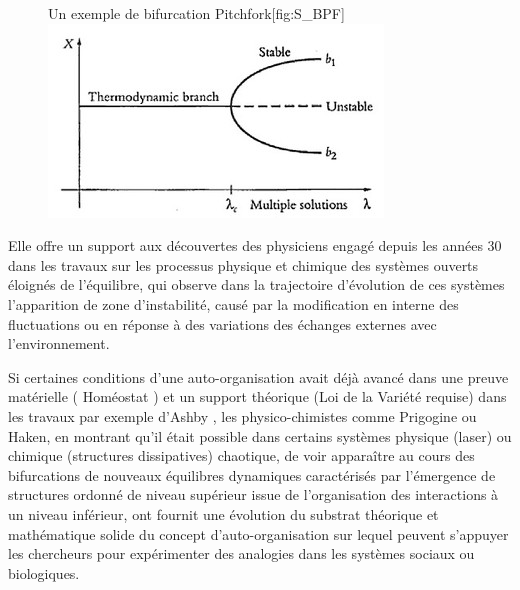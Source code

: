 \begin{figure}[h]
\begin{sidecaption}[fortoc]{Un exemple de bifurcation Pitchfork}[fig:S_BPF]
  \centering
 \includegraphics[width=.7\linewidth]{pitchfork_bifurcation.jpeg}
  \end{sidecaption}
\end{figure}


Elle offre un support aux découvertes des physiciens engagé depuis les années 30 dans les travaux sur les processus physique et chimique des systèmes ouverts éloignés de l'équilibre, qui observe dans la trajectoire d'évolution de ces systèmes l'apparition de zone d'instabilité, causé par la modification en interne des fluctuations ou en réponse à des variations des échanges externes avec l'environnement. 

Si certaines conditions d'une auto-organisation avait déjà avancé dans une preuve matérielle ( Homéostat ) et un support théorique (Loi de la Variété requise) dans les travaux par exemple d'Ashby \autocite[800-801]{Pouvreau2013}, les physico-chimistes comme Prigogine ou Haken, en montrant qu'il était possible dans certains systèmes physique (laser) ou chimique (structures dissipatives) chaotique, de voir apparaître au cours des bifurcations de nouveaux équilibres dynamiques caractérisés par l'émergence de structures ordonné de niveau supérieur issue de l'organisation des interactions à un niveau inférieur, ont fournit une évolution du substrat théorique et mathématique solide du concept d'auto-organisation sur lequel peuvent s'appuyer les chercheurs pour expérimenter des analogies dans les systèmes sociaux ou biologiques.


